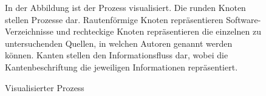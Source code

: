 \begin{figure}
    \begin{center}
        
    \end{center}
    \caption{Visualisierter Prozess}
    \label{fig:programmablauf}
    \small
    In der Abbildung ist der Prozess visualisiert. Die runden Knoten stellen Prozesse dar. Rautenförmige Knoten repräsentieren Software-Verzeichnisse und rechteckige Knoten repräsentieren die einzelnen zu untersuchenden Quellen, in welchen Autoren genannt werden können. Kanten stellen den Informationsfluss dar, wobei die Kantenbeschriftung die jeweiligen Informationen repräsentiert.
\end{figure}




